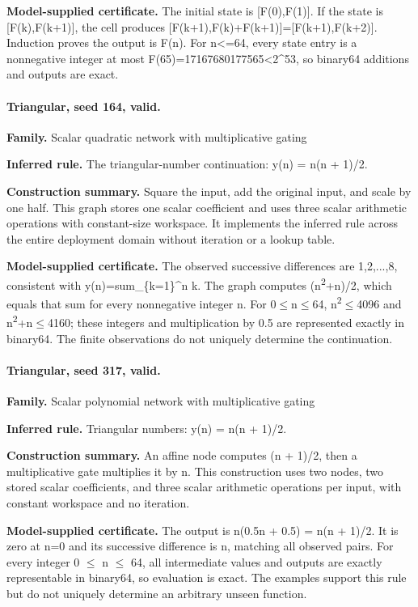 \textbf{Model-supplied certificate.} The initial state is [F(0),F(1)]. If the state is [F(k),F(k+1)], the cell produces [F(k+1),F(k)+F(k+1)]=[F(k+1),F(k+2)]. Induction proves the output is F(n). For n<=64, every state entry is a nonnegative integer at most F(65)=17167680177565<2\textasciicircum{}53, so binary64 additions and outputs are exact.


\paragraph{Triangular, seed 164, valid.}

\textbf{Family.} Scalar quadratic network with multiplicative gating


\textbf{Inferred rule.} The triangular-number continuation: y(n) = n(n + 1)/2.


\textbf{Construction summary.} Square the input, add the original input, and scale by one half. This graph stores one scalar coefficient and uses three scalar arithmetic operations with constant-size workspace. It implements the inferred rule across the entire deployment domain without iteration or a lookup table.


\textbf{Model-supplied certificate.} The observed successive differences are 1,2,...,8, consistent with y(n)=sum\_\{k=1\}\textasciicircum{}n k. The graph computes (n\textsuperscript{2}+n)/2, which equals that sum for every nonnegative integer n. For 0\ensuremath{\leq}n\ensuremath{\leq}64, n\textsuperscript{2}\ensuremath{\leq}4096 and n\textsuperscript{2}+n\ensuremath{\leq}4160; these integers and multiplication by 0.5 are represented exactly in binary64. The finite observations do not uniquely determine the continuation.


\paragraph{Triangular, seed 317, valid.}

\textbf{Family.} Scalar polynomial network with multiplicative gating


\textbf{Inferred rule.} Triangular numbers: y(n) = n(n + 1)/2.


\textbf{Construction summary.} An affine node computes (n + 1)/2, then a multiplicative gate multiplies it by n. This construction uses two nodes, two stored scalar coefficients, and three scalar arithmetic operations per input, with constant workspace and no iteration.


\textbf{Model-supplied certificate.} The output is n(0.5n + 0.5) = n(n + 1)/2. It is zero at n=0 and its successive difference is n, matching all observed pairs. For every integer 0 \ensuremath{\leq} n \ensuremath{\leq} 64, all intermediate values and outputs are exactly representable in binary64, so evaluation is exact. The examples support this rule but do not uniquely determine an arbitrary unseen function.


